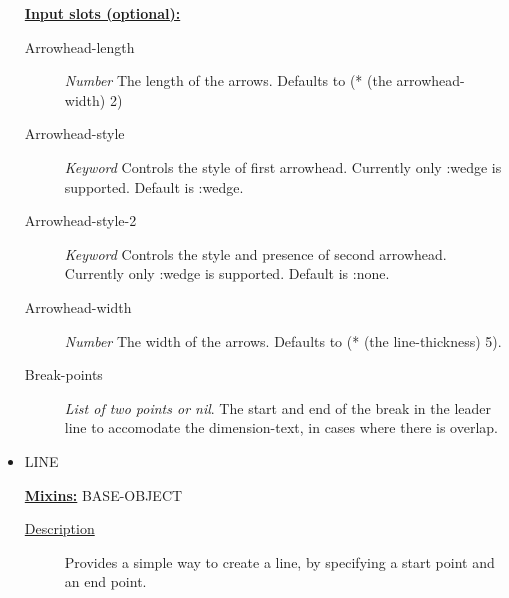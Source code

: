 \documentclass [11pt]{book}
\begin{document}
\begin{itemize}
\begin{description}
\end{description}






\textbf{
\underline{Input slots (optional):}}

\begin{description}

\item [Arrowhead-length]
\emph{Number} The length of the arrows. Defaults to (* (the arrowhead-width) 2)


\item [Arrowhead-style]
\emph{Keyword} Controls the style of first arrowhead. Currently only :wedge is supported. Default is :wedge.


\item [Arrowhead-style-2]
\emph{Keyword} Controls the style and presence of second arrowhead.
Currently only :wedge is supported. Default is :none.


\item [Arrowhead-width]
\emph{Number} The width of the arrows. Defaults to (* (the line-thickness) 5).


\item [Break-points]
\emph{List of two points or nil}.
The start and end of the break in the leader line to accomodate the dimension-text,
in cases where there is overlap.


\end{description}







\item {}LINE


\textbf{
\underline{Mixins:}} BASE-OBJECT





\begin{description}

\item [
\underline{Description}]


Provides a simple way to create a line, 
by specifying a start point and an end point.



\end{description}









\end{itemize}
\end{document}
